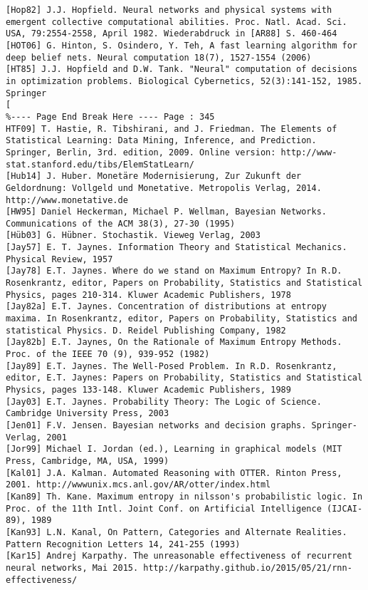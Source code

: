 \documentclass[10pt]{article}
\begin{document}
\begin{verbatim}
[Hop82] J.J. Hopfield. Neural networks and physical systems with emergent collective computational abilities. Proc. Natl. Acad. Sci. USA, 79:2554-2558, April 1982. Wiederabdruck in [AR88] S. 460-464
[HOT06] G. Hinton, S. Osindero, Y. Teh, A fast learning algorithm for deep belief nets. Neural computation 18(7), 1527-1554 (2006)
[HT85] J.J. Hopfield and D.W. Tank. "Neural" computation of decisions in optimization problems. Biological Cybernetics, 52(3):141-152, 1985. Springer
[
%---- Page End Break Here ---- Page : 345
HTF09] T. Hastie, R. Tibshirani, and J. Friedman. The Elements of Statistical Learning: Data Mining, Inference, and Prediction. Springer, Berlin, 3rd. edition, 2009. Online version: http://www-stat.stanford.edu/tibs/ElemStatLearn/
[Hub14] J. Huber. Monetäre Modernisierung, Zur Zukunft der Geldordnung: Vollgeld und Monetative. Metropolis Verlag, 2014. http://www.monetative.de
[HW95] Daniel Heckerman, Michael P. Wellman, Bayesian Networks. Communications of the ACM 38(3), 27-30 (1995)
[Hüb03] G. Hübner. Stochastik. Vieweg Verlag, 2003
[Jay57] E. T. Jaynes. Information Theory and Statistical Mechanics. Physical Review, 1957
[Jay78] E.T. Jaynes. Where do we stand on Maximum Entropy? In R.D. Rosenkrantz, editor, Papers on Probability, Statistics and Statistical Physics, pages 210-314. Kluwer Academic Publishers, 1978
[Jay82a] E.T. Jaynes. Concentration of distributions at entropy maxima. In Rosenkrantz, editor, Papers on Probability, Statistics and statistical Physics. D. Reidel Publishing Company, 1982
[Jay82b] E.T. Jaynes, On the Rationale of Maximum Entropy Methods. Proc. of the IEEE 70 (9), 939-952 (1982)
[Jay89] E.T. Jaynes. The Well-Posed Problem. In R.D. Rosenkrantz, editor, E.T. Jaynes: Papers on Probability, Statistics and Statistical Physics, pages 133-148. Kluwer Academic Publishers, 1989
[Jay03] E.T. Jaynes. Probability Theory: The Logic of Science. Cambridge University Press, 2003
[Jen01] F.V. Jensen. Bayesian networks and decision graphs. Springer-Verlag, 2001
[Jor99] Michael I. Jordan (ed.), Learning in graphical models (MIT Press, Cambridge, MA, USA, 1999)
[Kal01] J.A. Kalman. Automated Reasoning with OTTER. Rinton Press, 2001. http://wwwunix.mcs.anl.gov/AR/otter/index.html
[Kan89] Th. Kane. Maximum entropy in nilsson's probabilistic logic. In Proc. of the 11th Intl. Joint Conf. on Artificial Intelligence (IJCAI-89), 1989
[Kan93] L.N. Kanal, On Pattern, Categories and Alternate Realities. Pattern Recognition Letters 14, 241-255 (1993)
[Kar15] Andrej Karpathy. The unreasonable effectiveness of recurrent neural networks, Mai 2015. http://karpathy.github.io/2015/05/21/rnn-effectiveness/

\end{verbatim}
\end{document}
